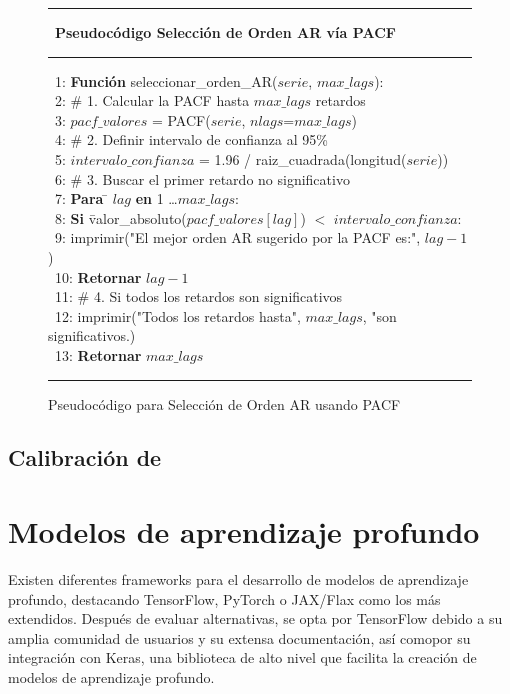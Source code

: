 \begin{figure}[H]
{\small
 \hrule \
 {\bf\small Pseudocódigo Selección de Orden AR vía PACF}
 \hrule
\begin{center}
\begin{tabbing}
\ 1: {\bf Fun}\={\bf ción} seleccionar\_orden\_AR($serie$, $max\_lags$): \\
\ 2: \> \# 1. Calcular la PACF hasta $max\_lags$ retardos \\
\ 3: \> $pacf\_valores$ = PACF($serie$, $nlags$=$max\_lags$) \\
\ 4: \> \# 2. Definir intervalo de confianza al 95\% \\
\ 5: \> $intervalo\_confianza$ = 1.96 / raiz\_cuadrada(longitud($serie$)) \\
\ 6: \> \# 3. Buscar el primer retardo no significativo \\
\ 7: \> {\bf Para} \= $lag$ {\bf en} 1 \dots $max\_lags$: \\
\ 8: \> \> {\bf Si} \= valor\_absoluto($pacf\_valores[lag]$) $<$ $intervalo\_confianza$: \\
\ 9: \> \> \> imprimir("El mejor orden AR sugerido por la PACF es:", $lag-1$) \\
\ 10: \> \> \> {\bf Retornar} $lag-1$ \\
\ 11: \> \# 4. Si todos los retardos son significativos \\
\ 12: \> imprimir("Todos los retardos hasta", $max\_lags$, "son significativos.) \\
\ 13: \> {\bf Retornar} $max\_lags$ \\
\end{tabbing}
\end{center}
\hrule
}
\caption{Pseudocódigo para Selección de Orden AR usando PACF}
\label{pacf_ar_order}
\end{figure}

\subsection{Calibración de }

\section{Modelos de aprendizaje profundo}
Existen diferentes frameworks para el desarrollo de modelos de aprendizaje profundo, destacando TensorFlow, PyTorch o JAX/Flax como los más extendidos.
Después de evaluar alternativas, se opta por TensorFlow debido a su amplia comunidad de usuarios y su extensa documentación, así comopor su integración con Keras, 
una biblioteca de alto nivel que facilita la creación de modelos de aprendizaje profundo.

